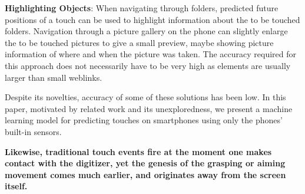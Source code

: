 \textbf{Highlighting Objects}: When navigating through folders, predicted future positions of a touch can be used to highlight information about the to be touched folders. 
	Navigation through a picture gallery on the phone can slightly enlarge the to be touched pictures to give a small preview, maybe showing picture information of where and when the picture was taken.
	The accuracy required for this approach does not necessarily have to be very high as elements are usually larger than small weblinks.

Despite its novelties, accuracy of some of these solutions has been low. In this paper, motivated by related work and its unexploredness, we present a machine learning model for predicting touches on smartphones using only the phones' built-in sensors.


\textbf{Likewise, traditional touch events fire at the moment one makes contact with the digitizer, yet the genesis of the grasping or aiming movement comes much earlier, and originates away from the screen itself. }

